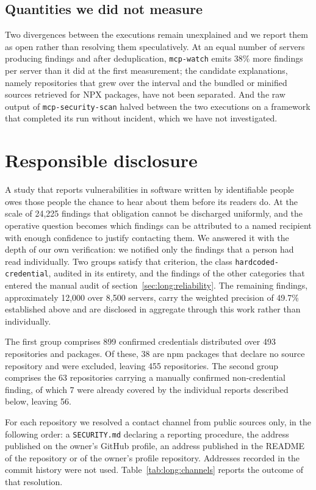 \subsection{Quantities we did not measure}

Two divergences between the executions remain unexplained and we report them as
open rather than resolving them speculatively. At an equal number of servers
producing findings and after deduplication, \texttt{mcp-watch} emits 38\% more
findings per server than it did at the first measurement; the candidate
explanations, namely repositories that grew over the interval and the bundled or
minified sources retrieved for NPX packages, have not been separated. And the raw
output of \texttt{mcp-security-scan} halved between the two executions on a
framework that completed its run without incident, which we have not investigated.

\section{Responsible disclosure}
\label{sec:long:disclosure}

A study that reports vulnerabilities in software written by identifiable people
owes those people the chance to hear about them before its readers do. At the
scale of 24,225 findings that obligation cannot be discharged uniformly, and the
operative question becomes which findings can be attributed to a named recipient
with enough confidence to justify contacting them. We answered it with the depth
of our own verification: we notified only the findings that a person had read
individually. Two groups satisfy that criterion, the class
\texttt{hardcoded-credential}, audited in its entirety, and the findings of the
other categories that entered the manual audit of
section~\ref{sec:long:reliability}. The remaining findings, approximately 12,000
over 8,500 servers, carry the weighted precision of 49.7\% established above and
are disclosed in aggregate through this work rather than individually.

The first group comprises 899 confirmed credentials distributed over 493
repositories and packages. Of these, 38 are npm packages that declare no source
repository and were excluded, leaving 455 repositories. The second group
comprises the 63 repositories carrying a manually confirmed non-credential
finding, of which 7 were already covered by the individual reports described
below, leaving 56.

For each repository we resolved a contact channel from public sources only, in
the following order: a \texttt{SECURITY.md} declaring a reporting procedure, the
address published on the owner's GitHub profile, an address published in the
README of the repository or of the owner's profile repository. Addresses recorded
in the commit history were not used. Table~\ref{tab:long:channels} reports the
outcome of that resolution.

